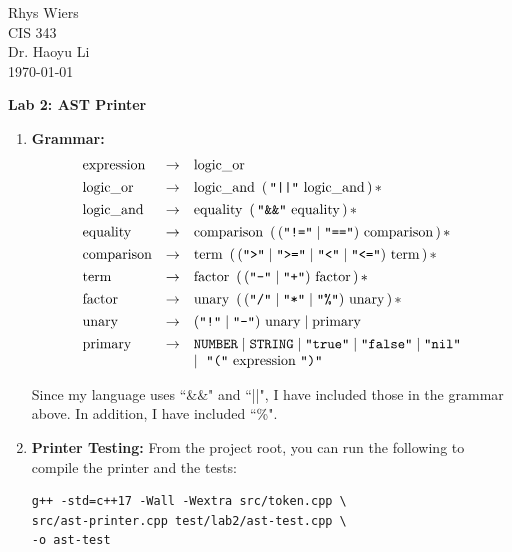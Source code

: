 \documentclass[12pt]{article}
\theoremstyle{definition}
\newcommand{\term}[1]{\texttt{"#1"}}
\newcommand{\nt}[1]{\text{#1}}
\begin{document}
    \noindent
    Rhys Wiers\\
    CIS 343\\
    Dr. Haoyu Li\\
    \today

    \begin{center}
        {\Large \textbf{Lab 2: AST Printer}}
    \end{center}

    \begin{enumerate}
        \item \textbf{Grammar:}
            \begin{equation*}
            \begin{array}{lcl}
            \nt{expression} & \rightarrow & \nt{logic\_or} \\[4pt]
            \nt{logic\_or}  & \rightarrow & \nt{logic\_and}\ \left(\,\term{\textbar\textbar}\ \nt{logic\_and}\,\right)* \\[4pt]
            \nt{logic\_and} & \rightarrow & \nt{equality}\ \left(\,\term{\&\&}\ \nt{equality}\,\right)* \\[4pt]
            \nt{equality}   & \rightarrow & \nt{comparison}\ \left(\,(\term{!=} \mid \term{==})\ \nt{comparison}\,\right)* \\[4pt]
            \nt{comparison} & \rightarrow & \nt{term}\ \left(\,(\term{>} \mid \term{>=} \mid \term{<} \mid \term{<=})\ \nt{term}\,\right)* \\[4pt]
            \nt{term}       & \rightarrow & \nt{factor}\ \left(\,(\term{-} \mid \term{+})\ \nt{factor}\,\right)* \\[4pt]
            \nt{factor}     & \rightarrow & \nt{unary}\ \left(\,(\term{/} \mid \term{*} \mid \term{\%})\ \nt{unary}\,\right)* \\[4pt]
            \nt{unary}      & \rightarrow & (\term{!} \mid \term{-})\ \nt{unary} \mid \nt{primary} \\[4pt]
            \nt{primary}    & \rightarrow & \texttt{NUMBER} \mid \texttt{STRING} \mid \term{true} \mid \term{false} \mid \term{nil} \\
                            &             & \mid\ \term{(}\ \nt{expression}\ \term{)}
            \end{array}
            \end{equation*}

            Since my language uses ``\&\&" and ``||", I have included those in the grammar above. In addition, I have included ``\%".
        \item \textbf{Printer Testing:}
            From the project root, you can run the following to compile the printer and the tests:
            \begin{verbatim}
g++ -std=c++17 -Wall -Wextra src/token.cpp \
src/ast-printer.cpp test/lab2/ast-test.cpp \
-o ast-test
            \end{verbatim}


\end{enumerate}
\end{document}
